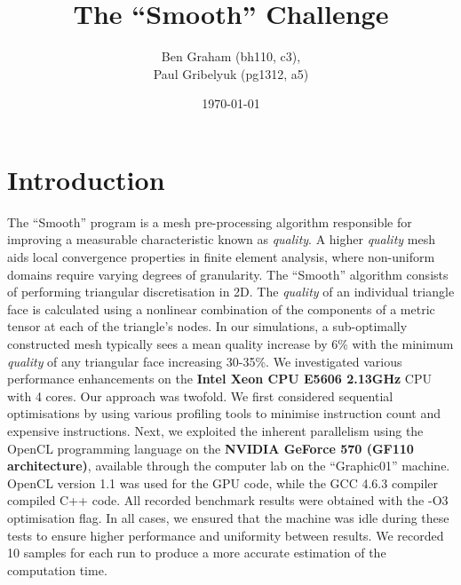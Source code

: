 \documentclass[a4paper,11pt, twocolumn]{article}
\author{
    Ben Graham (bh110, c3), \\
    Paul Gribelyuk (pg1312, a5)
}
\date{\today}
\title{The ``Smooth'' Challenge}
\begin{document}
\maketitle
\section{Introduction}
The ``Smooth'' program is a mesh pre-processing algorithm responsible for improving a measurable characteristic known as \emph{quality}.
A higher \emph{quality} mesh aids local convergence properties in finite element analysis, where non-uniform domains require varying degrees of granularity.
The ``Smooth'' algorithm consists of performing triangular discretisation in 2D.
The \emph{quality} of an individual triangle face is calculated using a nonlinear combination of the components of a metric tensor at each of the triangle's nodes.
In our simulations, a sub-optimally constructed mesh typically sees a mean quality increase by 6\% with the minimum \emph{quality} of any triangular face increasing 30-35\%.
We investigated various performance enhancements on the \textbf{Intel Xeon CPU E5606 2.13GHz} CPU with 4 cores.
Our approach was twofold.
We first considered sequential optimisations by using various profiling tools to minimise instruction count and expensive instructions.
Next, we exploited the inherent parallelism using the OpenCL programming language on the \textbf{NVIDIA GeForce 570 (GF110 architecture)}, available through the computer lab on the ``Graphic01'' machine.
OpenCL version 1.1 was used for the GPU code, while the GCC 4.6.3 compiler compiled C++ code.
All recorded benchmark results were obtained with the -O3 optimisation flag.
In all cases, we ensured that the machine was idle during these tests to ensure higher performance and uniformity between results.
We recorded 10 samples for each run to produce a more accurate estimation of the computation time.
\end{document}
